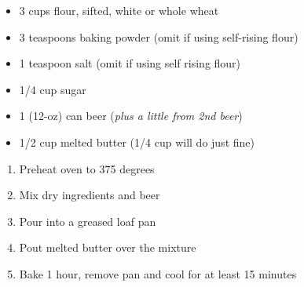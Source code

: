 \fromMom

\ingredients
\begin{itemize}
        \item 3 cups flour, sifted, white or whole wheat
        \item 3 teaspoons baking powder (omit if using self-rising flour)
        \item 1 teaspoon salt (omit if using self rising flour)
        \item 1/4 cup sugar
        \item 1 (12-oz) can beer (\emph{plus a little from 2nd beer})
        \item 1/2 cup melted butter (1/4 cup will do just fine)
\end{itemize}

\instructions
\begin{enumerate}
        \item Preheat oven to 375 degrees
        \item Mix dry ingredients and beer
        \item Pour into a greased loaf pan
        \item Pout melted butter over the mixture
        \item Bake 1 hour, remove pan and cool for at least 15 minutes
\end{enumerate}
